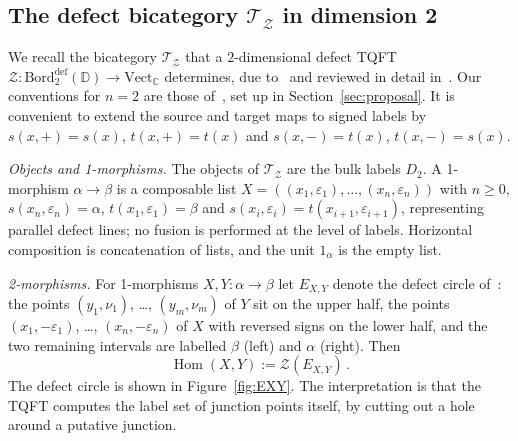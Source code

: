 \documentclass[11pt]{article}
\theoremstyle{definition}
\newcommand{\cT}{\mathcal{T}}
\newcommand{\cZ}{\mathcal{Z}}
\newcommand{\bC}{\mathbb{C}}
\newcommand{\bD}{\mathbb{D}}
\newcommand{\Bord}{\mathrm{Bord}}
\newcommand{\Vect}{\mathrm{Vect}}
\begin{document}
\subsection{The defect bicategory \texorpdfstring{$\cT_\cZ$}{TZ} in dimension 2}
\label{sec:defectTQFT}

We recall the bicategory $\cT_\cZ$ that a $2$-dimensional defect TQFT $\cZ \colon \Bord_2^{\textrm{def}}(\bD) \to \Vect_\bC$ determines, due to~\cite{DKR11} and reviewed in detail in~\cite[\S 2.3]{Car16}. Our conventions for $n = 2$ are those of~\cite{Car16}, set up in Section~\ref{sec:proposal}. It is convenient to extend the source and target maps to signed labels by $s(x,+) = s(x)$, $t(x,+) = t(x)$ and $s(x,-) = t(x)$, $t(x,-) = s(x)$.

\emph{Objects and 1-morphisms.} The objects of $\cT_\cZ$ are the bulk labels $D_2$. A 1-morphism $\alpha \to \beta$ is a composable list $X = ((x_1,\varepsilon_1), \dots, (x_n,\varepsilon_n))$ with $n \geq 0$, $s(x_n,\varepsilon_n) = \alpha$, $t(x_1,\varepsilon_1) = \beta$ and $s(x_i,\varepsilon_i) = t(x_{i+1},\varepsilon_{i+1})$, representing parallel defect lines; no fusion is performed at the level of labels. Horizontal composition is concatenation of lists, and the unit $1_\alpha$ is the empty list.

\emph{2-morphisms.} For 1-morphisms $X, Y \colon \alpha \to \beta$ let $E_{X,Y}$ denote the defect circle of~\cite[eq.~(2.16)]{Car16}: the points $(y_1,\nu_1)$, \dots, $(y_m,\nu_m)$ of $Y$ sit on the upper half, the points $(x_1,-\varepsilon_1)$, \dots, $(x_n,-\varepsilon_n)$ of $X$ with reversed signs on the lower half, and the two remaining intervals are labelled $\beta$ (left) and $\alpha$ (right). Then
\begin{equation}
  \operatorname{Hom}(X,Y) := \cZ(E_{X,Y}) \, .
\end{equation}
The defect circle is shown in Figure~\ref{fig:EXY}. The interpretation is that the TQFT computes the label set of junction points itself, by cutting out a hole around a putative junction.
\end{document}
